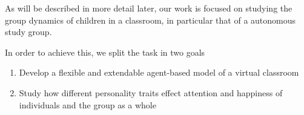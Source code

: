 \bb

As will be described in more detail later, our work is focused on studying the group
dynamics of children in a classroom, in particular that of a autonomous study group.

In order to achieve this, we split the task in two goals
\begin{enumerate}
    \item Develop a flexible and extendable agent-based model of a virtual classroom
    \item Study how different personality traits effect attention and happiness of individuals and the group as a whole
\end{enumerate}
